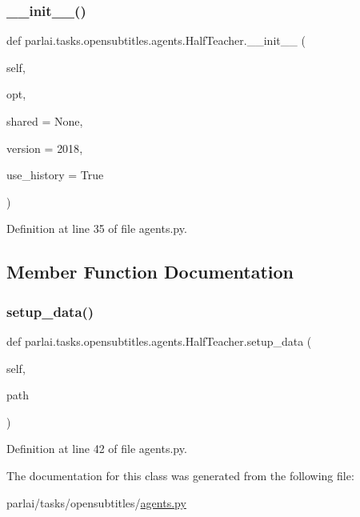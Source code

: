 \subsubsection{\texorpdfstring{\+\_\+\+\_\+init\+\_\+\+\_\+()}{\_\_init\_\_()}}
{\footnotesize\ttfamily def parlai.\+tasks.\+opensubtitles.\+agents.\+Half\+Teacher.\+\_\+\+\_\+init\+\_\+\+\_\+ (\begin{DoxyParamCaption}\item[{}]{self,  }\item[{}]{opt,  }\item[{}]{shared = {\ttfamily None},  }\item[{}]{version = {\ttfamily \textquotesingle{}2018\textquotesingle{}},  }\item[{}]{use\+\_\+history = {\ttfamily True} }\end{DoxyParamCaption})}



Definition at line 35 of file agents.\+py.



\subsection{Member Function Documentation}
\mbox{\label{classparlai_1_1tasks_1_1opensubtitles_1_1agents_1_1HalfTeacher_a36081b74536cdad3bc3673b324da1f02}} 
\subsubsection{\texorpdfstring{setup\+\_\+data()}{setup\_data()}}
{\footnotesize\ttfamily def parlai.\+tasks.\+opensubtitles.\+agents.\+Half\+Teacher.\+setup\+\_\+data (\begin{DoxyParamCaption}\item[{}]{self,  }\item[{}]{path }\end{DoxyParamCaption})}



Definition at line 42 of file agents.\+py.



The documentation for this class was generated from the following file\+:\begin{DoxyCompactItemize}
\item 
parlai/tasks/opensubtitles/\hyperlink{parlai_2tasks_2opensubtitles_2agents_8py}{agents.\+py}\end{DoxyCompactItemize}
